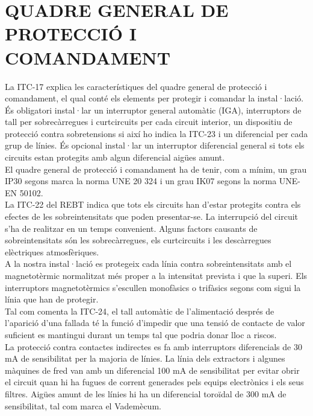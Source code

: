 \chapter{\uppercase{Quadre general de protecció i comandament}}
La ITC-17 explica les característiques del quadre general de protecció i comandament, el qual conté els elements per protegir i comandar la instal·lació. És obligatori instal·lar un interruptor general automàtic (IGA), interruptors de tall per sobrecàrregues i curtcircuits per cada circuit interior, un dispositiu de protecció contra sobretensions si així ho indica la ITC-23 i un diferencial per cada grup de línies. És opcional instal·lar un interruptor diferencial general si tots els circuits estan protegits amb algun diferencial aigües amunt.\\
\newline El quadre general de protecció i comandament ha de tenir, com a mínim, un grau IP30 segons marca la norma UNE 20 324 i un grau IK07 segons la norma UNE-EN 50102.\\
\newline
La ITC-22 del REBT indica que tots els circuits han d'estar protegits contra els efectes de les sobreintensitats que poden presentar-se. La interrupció del circuit s'ha de realitzar en un temps convenient. Alguns factors causants de sobreintensitats són les sobrecàrregues, els curtcircuits i les descàrregues elèctriques atmosfèriques.\\
\newline A la nostra instal·lació es protegeix cada línia contra sobreintensitats amb el magnetotèrmic normalitzat més proper a la intensitat prevista i que la superi. Els interruptors magnetotèrmics s'escullen monofàsics o trifàsics segons com sigui la línia que han de protegir.\\
\newline
Tal com comenta la ITC-24, el tall automàtic de l'alimentació després de l'aparició d'una fallada té la funció d'impedir que una tensió de contacte de valor suficient es mantingui durant un temps tal que podria donar lloc a riscos.\\
\newline La protecció contra contactes indirectes es fa amb interruptors diferencials de 30 mA de sensibilitat per la majoria de línies. La línia dels extractors i algunes màquines de fred van amb un diferencial 100 mA de sensibilitat per evitar obrir el circuit quan hi ha fugues de corrent generades pels equips electrònics i els seus filtres. Aigües amunt de les línies hi ha un diferencial toroïdal de 300 mA de sensibilitat, tal com marca el Vademècum.\\
